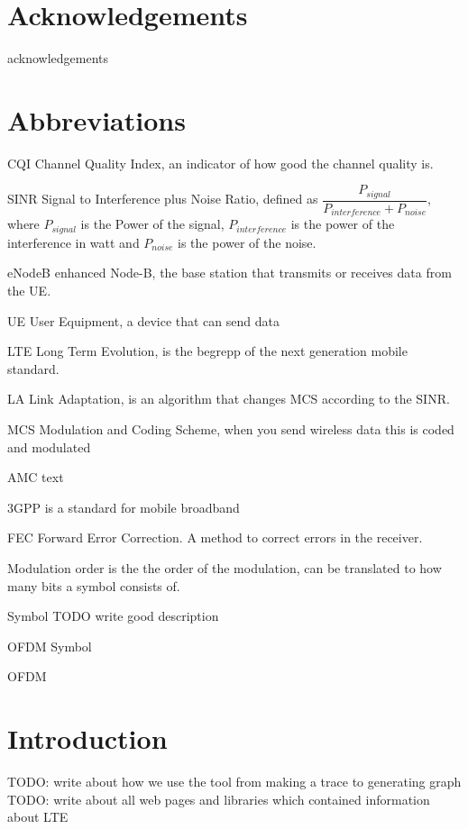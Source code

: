 \documentclass[cropmarks, frame, english]{idamasterthesis}
\author{Paul Nedstrand \& Razmus Lindgren}
\newcommand{\abbrlabel}[1]{\makebox[3cm][l]{\textbf{#1}\ \dotfill}}
\newenvironment{abbreviations}{\begin{list}{}{\renewcommand{\makelabel}{\abbrlabel}}}{\end{list}}
\begin{document}
\makeintropages

\chapter*{Acknowledgements}
acknowledgements 

\chapter*{Abbreviations}

 \begin{abbreviations}
\item[CQI] Channel Quality Index, an indicator of how good the channel quality is.
\item[SINR] Signal to Interference plus Noise Ratio, defined as $\dfrac{P_{signal}}{P_{interference} + P_{noise}}$, where $P_{signal}$ is the Power of the signal, $P_{interference}$ is the power of the interference in watt and $P_{noise}$ is the power of the noise.
\item[eNodeB] enhanced Node-B, the base station that transmits or receives data from the UE.
\item[UE] User Equipment, a device that can send data
\item[LTE] Long Term Evolution, is the begrepp of the next generation mobile standard.
\item[LA] Link Adaptation, is an algorithm that changes MCS according to the SINR.
\item[MCS] Modulation and Coding Scheme, when you send wireless data this is coded and modulated
\item[AMC] text
\item[3GPP] is a standard for mobile broadband
\item[FEC] Forward Error Correction. A method to correct errors in the receiver.
\item[Modulation order] is the the order of the modulation, can be translated to how many bits a symbol consists of.
\item[Symbol] TODO write good description
\item[OFDM Symbol]
\item[OFDM]

\end{abbreviations}



\chapter{Introduction}
TODO: write about how we use the tool from making a trace to generating graph\\
TODO: write about all web pages and libraries which contained information about LTE
\end{document}
